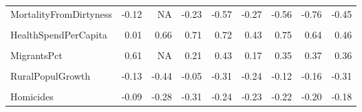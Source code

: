 \documentclass[
]{article}
\begin{document}
\begin{table}
{\begin{tabular}[t]{lrrrrrrrr}
MortalityFromDirtyness & -0.12 & NA & -0.23 & -0.57 & -0.27 & -0.56 & -0.76 & -0.45\\
\addlinespace
\cellcolor{gray!10}{UHCServiceCoverage} & \cellcolor{gray!10}{0.10} & \cellcolor{gray!10}{0.76} & \cellcolor{gray!10}{0.54} & \cellcolor{gray!10}{0.70} & \cellcolor{gray!10}{0.46} & \cellcolor{gray!10}{0.73} & \cellcolor{gray!10}{0.82} & \cellcolor{gray!10}{0.51}\\
HealthSpendPerCapita & 0.01 & 0.66 & 0.71 & 0.72 & 0.43 & 0.75 & 0.64 & 0.46\\
\cellcolor{gray!10}{GovtHealthSpendPerCapita} & \cellcolor{gray!10}{0.02} & \cellcolor{gray!10}{0.66} & \cellcolor{gray!10}{0.69} & \cellcolor{gray!10}{0.71} & \cellcolor{gray!10}{0.39} & \cellcolor{gray!10}{0.74} & \cellcolor{gray!10}{0.63} & \cellcolor{gray!10}{0.46}\\
MigrantsPct & 0.61 & NA & 0.21 & 0.43 & 0.17 & 0.35 & 0.37 & 0.36\\
\cellcolor{gray!10}{FoodInsecurityPct} & \cellcolor{gray!10}{-0.08} & \cellcolor{gray!10}{-0.69} & \cellcolor{gray!10}{-0.49} & \cellcolor{gray!10}{-0.74} & \cellcolor{gray!10}{-0.47} & \cellcolor{gray!10}{-0.72} & \cellcolor{gray!10}{-0.77} & \cellcolor{gray!10}{-0.51}\\
\addlinespace
RuralPopulGrowth & -0.13 & -0.44 & -0.05 & -0.31 & -0.24 & -0.12 & -0.16 & -0.31\\
\cellcolor{gray!10}{VoiceAccountability} & \cellcolor{gray!10}{-0.14} & \cellcolor{gray!10}{0.65} & \cellcolor{gray!10}{0.54} & \cellcolor{gray!10}{0.75} & \cellcolor{gray!10}{0.13} & \cellcolor{gray!10}{0.54} & \cellcolor{gray!10}{0.44} & \cellcolor{gray!10}{0.68}\\
Homicides & -0.09 & -0.28 & -0.31 & -0.24 & -0.23 & -0.22 & -0.20 & -0.18\\
\bottomrule
\end{tabular}}
\end{table}\begin{table}
\centering
\caption{\label{tab:Correlation}Correlation Matrix: Columns 17 to 24}
\centering
{}
\end{table}
\end{document}
